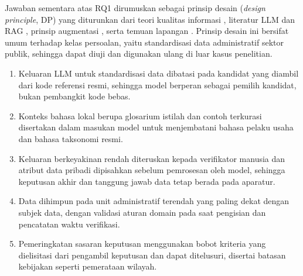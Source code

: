 \documentclass[12pt,a4paper]{report}
\begin{document}
Jawaban sementara atas RQ1 dirumuskan sebagai prinsip desain (\textit{design principle}, DP) yang diturunkan dari teori kualitas informasi \cite{delone2003success,iso25012}, literatur LLM dan RAG \cite{gao2023ragsurvey,ji2023hallucination}, prinsip augmentasi \cite{raisch2021automation}, serta temuan lapangan \cite{wawancarastaf2026}. Prinsip desain ini bersifat umum terhadap kelas persoalan, yaitu standardisasi data administratif sektor publik, sehingga dapat diuji dan digunakan ulang di luar kasus penelitian.
\begin{enumerate}[label=\textbf{DP\arabic*}:, leftmargin=*]
  \item Keluaran LLM untuk standardisasi data dibatasi pada kandidat yang diambil dari kode referensi resmi, sehingga model berperan sebagai pemilih kandidat, bukan pembangkit kode bebas.
  \item Konteks bahasa lokal berupa glosarium istilah dan contoh terkurasi disertakan dalam masukan model untuk menjembatani bahasa pelaku usaha dan bahasa taksonomi resmi.
  \item Keluaran berkeyakinan rendah diteruskan kepada verifikator manusia dan atribut data pribadi dipisahkan sebelum pemrosesan oleh model, sehingga keputusan akhir dan tanggung jawab data tetap berada pada aparatur.
  \item Data dihimpun pada unit administratif terendah yang paling dekat dengan subjek data, dengan validasi aturan domain pada saat pengisian dan pencatatan waktu verifikasi.
  \item Pemeringkatan sasaran keputusan menggunakan bobot kriteria yang dielisitasi dari pengambil keputusan dan dapat ditelusuri, disertai batasan kebijakan seperti pemerataan wilayah.
\end{enumerate}
\end{document}
